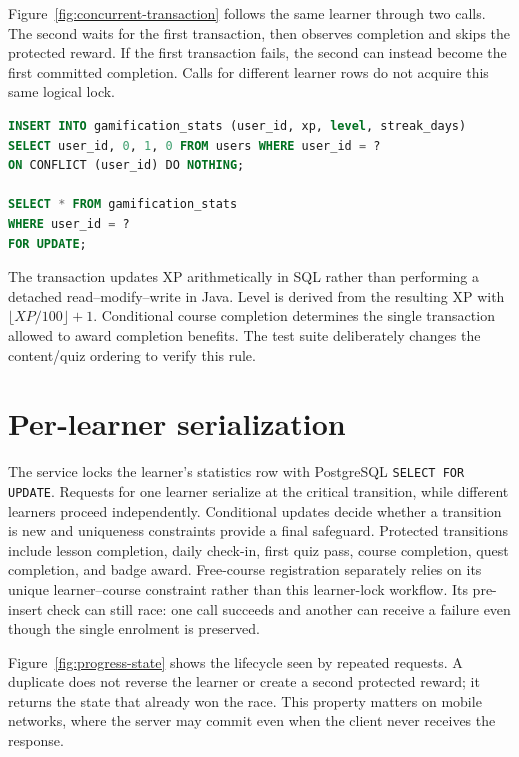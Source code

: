 \documentclass[12pt,a4paper,oneside]{report}
\begin{document}
\concurrenttransactiondiagram

Figure~\ref{fig:concurrent-transaction} follows the same learner through two calls.
The second waits for the first transaction, then observes completion and skips the
protected reward. If the first transaction fails, the second can instead become the
first committed completion. Calls for different learner rows do not acquire this
same logical lock.

\begin{lstlisting}[language=SQL,caption={Implemented per-learner lock initialization and acquisition}]
INSERT INTO gamification_stats (user_id, xp, level, streak_days)
SELECT user_id, 0, 1, 0 FROM users WHERE user_id = ?
ON CONFLICT (user_id) DO NOTHING;

SELECT * FROM gamification_stats
WHERE user_id = ?
FOR UPDATE;
\end{lstlisting}

The transaction updates XP arithmetically in SQL rather than performing a detached
read--modify--write in Java. Level is derived from the resulting XP with
$\lfloor XP/100 \rfloor + 1$. Conditional course completion determines the single
transaction allowed to award completion benefits. The test suite deliberately changes
the content/quiz ordering to verify this rule.

\section{Per-learner serialization}
The service locks the learner's statistics row with PostgreSQL
\texttt{SELECT FOR UPDATE}. Requests for one learner serialize at the critical
transition, while different learners proceed independently. Conditional updates
decide whether a transition is new and uniqueness constraints provide a final
safeguard. Protected transitions include lesson completion, daily check-in,
first quiz pass, course completion, quest completion, and badge award. Free-course
registration separately relies on its unique learner--course constraint rather than
this learner-lock workflow. Its pre-insert check can still race: one call succeeds
and another can receive a failure even though the single enrolment is preserved.

Figure~\ref{fig:progress-state} shows the lifecycle seen by repeated requests. A
duplicate does not reverse the learner or create a second protected reward; it returns
the state that already won the race. This property matters on mobile networks, where
the server may commit even when the client never receives the response.
\end{document}
